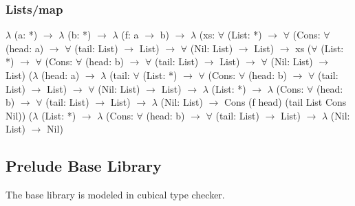 \documentclass[11pt,oneside]{article}
\begin{document}
\subsubsection*{Lists/map}
{\selectfont
\vspace{0.5cm}
$\lambda$ (a: *) $\rightarrow$ $\lambda$ (b: *) $\rightarrow$ $\lambda$ (f: a $\rightarrow$ b) $\rightarrow$ $\lambda$ (xs: $\forall$ (List: *)
$\rightarrow$ $\forall$ (Cons: $\forall$ (head: a) $\rightarrow$ $\forall$ (tail: List) $\rightarrow$ List) $\rightarrow$ $\forall$ (Nil: List) $\rightarrow$ List)
$\rightarrow$ xs ($\forall$ (List: *) $\rightarrow$ $\forall$ (Cons: $\forall$ (head: b) $\rightarrow$ $\forall$ (tail: List) $\rightarrow$ List)
$\rightarrow$ $\forall$ (Nil: List) $\rightarrow$ List) ($\lambda$ (head: a) $\rightarrow$ $\lambda$ (tail: $\forall$ (List: *) $\rightarrow$
$\forall$ (Cons: $\forall$ (head: b) $\rightarrow$ $\forall$ (tail: List) $\rightarrow$ List) $\rightarrow$ $\forall$ (Nil: List)
$\rightarrow$ List) $\rightarrow$ $\lambda$ (List: *) $\rightarrow$ $\lambda$ (Cons: $\forall$ (head: b) $\rightarrow$ $\forall$
(tail: List) $\rightarrow$ List) $\rightarrow$ $\lambda$ (Nil: List) $\rightarrow$ Cons (f head) (tail List Cons Nil))
($\lambda$ (List: *) $\rightarrow$ $\lambda$ (Cons: $\forall$ (head: b) $\rightarrow$ $\forall$ (tail: List) $\rightarrow$
List) $\rightarrow$ $\lambda$ (Nil: List) $\rightarrow$ Nil)
}

\newpage
\subsection{Prelude Base Library}

The base library is modeled in cubical type checker.
\end{document}
